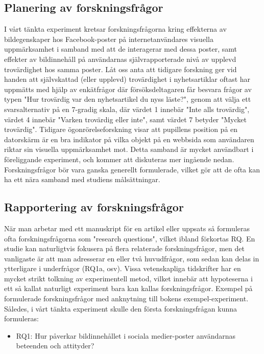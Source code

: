 \documentclass[
]{book}
\providecommand{\tightlist}{%
  \setlength{\itemsep}{0pt}\setlength{\parskip}{0pt}}
\begin{document}
\hypertarget{sub06.1.1}{%
\subsection{Planering av forskningsfrågor}\label{sub06.1.1}}

I vårt tänkta experiment kretsar forskningsfrågorna kring effekterna av bildegenskaper hos Facebook-poster på internetanvändares visuella uppmärksamhet i samband med att de interagerar med dessa poster, samt effekter av bildinnehåll på användarnas självrapporterade nivå av upplevd trovärdighet hos samma poster. Låt oss anta att tidigare forskning ger vid handen att självskattad (eller upplevd) trovärdighet i nyhetsartiklar oftast har uppmätts med hjälp av enkätfrågor där försöksdeltagaren får besvara frågor av typen "Hur trovärdig var den nyhetsartikel du nyss läste?", genom att välja ett svarsalternativ på en 7-gradig skala, där värdet 1 innebär "Inte alls trovärdig", värdet 4 innebär "Varken trovärdig eller inte", samt värdet 7 betyder "Mycket trovärdig". Tidigare ögonrörelseforskning visar att pupillens position på en datorskärm är en bra indikator på vilka objekt på en webbsida som användaren riktar sin visuella uppmärksamhet mot. Detta samband är mycket användbart i föreliggande experiment, och kommer att diskuteras mer ingående nedan. Forskningsfrågor bör vara ganska generellt formulerade, vilket gör att de ofta kan ha ett nära samband med studiens målsättningar.

\hypertarget{sub06.1.2}{%
\subsection{Rapportering av forskningsfrågor}\label{sub06.1.2}}

När man arbetar med ett manuskript för en artikel eller uppsats så formuleras ofta forskningsfrågorna som "research questions", vilket ibland förkortas RQ. En studie kan naturligtvis fokusera på flera relaterade forskningsfrågor, men det vanligaste är att man adresserar en eller två huvudfrågor, som sedan kan delas in ytterligare i underfrågor (RQ1a, osv). Vissa vetenskapliga tidskrifter har en mycket strikt tolkning av experimentell metod, vilket innebär att hypoteserna i ett så kallat naturligt experiment bara kan kallas forskningsfrågor. Exempel på formulerade forskningsfrågor med anknytning till bokens exempel-experiment. Således, i vårt tänkta experiment skulle den första forskningsfrågan kunna formuleras:

\begin{itemize}
\tightlist
\item
  RQ1: Hur påverkar bildinnehållet i sociala medier-poster användarnas beteenden och attityder?
\end{itemize}
\end{document}
